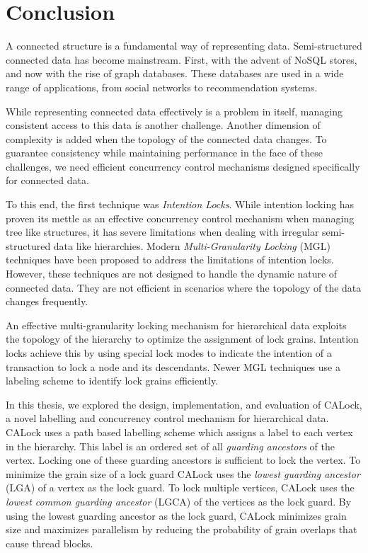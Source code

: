 %

\chapter{Conclusion} \label{chap:conclusion}
\minitoc

A connected structure is a fundamental way of representing data. Semi-structured connected data has become mainstream. First, with the advent of NoSQL stores, and now with the rise of graph databases. These databases are used in a wide range of applications, from social networks to recommendation systems. 

While representing connected data effectively is a problem in itself, managing consistent access to this data is another challenge. Another dimension of complexity is added when the topology of the connected data changes. To guarantee consistency while maintaining performance in the face of these challenges, we need efficient concurrency control mechanisms designed specifically for connected data.

To this end, the first technique was \emph{Intention Locks}. While intention locking has proven its mettle as an effective concurrency control mechanism when managing tree like structures, it has severe limitations when dealing with irregular semi-structured data like hierarchies. Modern \emph{Multi-Granularity Locking} (MGL) techniques have been proposed to address the limitations of intention locks. However, these techniques are not designed to handle the dynamic nature of connected data. They are not efficient in scenarios where the topology of the data changes frequently.

An effective multi-granularity locking mechanism for hierarchical data exploits the topology of the hierarchy to optimize the assignment of lock grains. Intention locks achieve this by using special lock modes to indicate the intention of a transaction to lock a node and its descendants. Newer MGL techniques use a labeling scheme to identify lock grains efficiently.  

In this thesis, we explored the design, implementation, and evaluation of CALock, a novel labelling and concurrency control mechanism for hierarchical data. CALock uses a path based labelling scheme which assigns a label to each vertex in the hierarchy. This label is an ordered set of all \emph{guarding ancestors} of the vertex. Locking one of these guarding ancestors is sufficient to lock the vertex. To minimize the grain size of a lock guard CALock uses the \emph{lowest guarding ancestor} (LGA) of a vertex as the lock guard. To lock multiple vertices, CALock uses the \emph{lowest common guarding ancestor} (LGCA) of the vertices as the lock guard. By using the lowest guarding ancestor as the lock guard, CALock minimizes grain size and maximizes parallelism by reducing the probability of grain overlaps that cause thread blocks.





